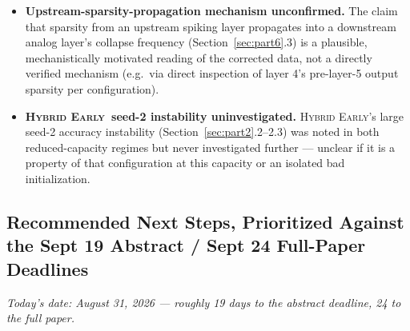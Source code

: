 \documentclass[11pt]{article}
\newcommand{\HybridEarly}{\textsc{Hybrid Early}}
\begin{document}
\begin{itemize}[leftmargin=1.8em]
the reference-norm-collapse artifact, but Experiment 3's original design goal (cleanly comparing
$D_{\ell,t}$ at $\theta{=}45^\circ$ vs.\ $\theta{=}90^\circ$ to show the exact-group-angle guarantee
reducing sensitivity specifically at $90^\circ$) is still not achievable at the deepest layer even
post-fix, since both angles are compared against the same reference representation and are equally
exposed to any residual near-zero-norm cells.
\item \textbf{Upstream-sparsity-propagation mechanism unconfirmed.} The claim that sparsity from an
upstream spiking layer propagates into a downstream analog layer's collapse frequency
(Section~\ref{sec:part6}.3) is a plausible, mechanistically motivated reading of the corrected data, not
a directly verified mechanism (e.g.\ via direct inspection of layer 4's pre-layer-5 output sparsity per
configuration).
\item \textbf{\HybridEarly\ seed-2 instability uninvestigated.} \HybridEarly's large seed-2 accuracy
instability (Section~\ref{sec:part2}.2--2.3) was noted in both reduced-capacity regimes but never
investigated further --- unclear if it is a property of that configuration at this capacity or an
isolated bad initialization.
\end{itemize}

\subsection{Recommended Next Steps, Prioritized Against the Sept 19 Abstract / Sept 24 Full-Paper Deadlines}

\textit{Today's date: August 31, 2026 --- roughly 19 days to the abstract deadline, 24 to the full paper.}
\end{document}
